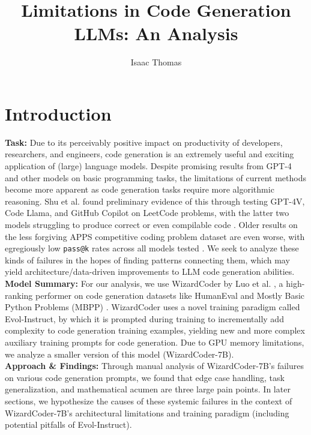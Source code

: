 \documentclass[10pt]{article}
\title{Limitations in Code Generation LLMs: An Analysis}
\author{Isaac Thomas}
\date{}
\newcommand{\code}[1]{\texttt{#1}}
\theoremstyle{definition}
\begin{document}
\maketitle
\section{Introduction}
\noindent\textbf{Task:} Due to its perceivably positive impact on productivity of developers, researchers, and engineers, code generation is an extremely useful and exciting application of (large) language models. Despite promising results from GPT-4 \cite{gpt4} and other models on basic programming tasks, the limitations of current methods become more apparent as code generation tasks require more algorithmic reasoning. Shu et al. found preliminary evidence of this through testing GPT-4V, Code Llama, and GitHub Copilot on LeetCode problems, with the latter two models struggling to produce correct or even compilable code \cite{llmeval1}. Older results on the less forgiving APPS competitive coding problem dataset are even worse, with egregiously low \code{pass@k} rates across all models tested \cite{paperswithcode}. We seek to analyze these kinds of failures in the hopes of finding patterns connecting them, which may yield architecture/data-driven improvements to LLM code generation abilities.\\

\noindent\textbf{Model Summary:} For our analysis, we use WizardCoder by Luo et al. \cite{wizardcoder}, a high-ranking performer on code generation datasets like HumanEval \cite{humaneval} and Mostly Basic Python Problems (MBPP) \cite{mbpp}. WizardCoder uses a novel training paradigm called Evol-Instruct, by which it is prompted during training to incrementally add complexity to code generation training examples, yielding new and more complex auxiliary training prompts for code generation. Due to GPU memory limitations, we analyze a smaller version of this model (WizardCoder-7B).\\

\noindent\textbf{Approach \& Findings:} Through manual analysis of WizardCoder-7B's failures on various code generation prompts, we found that edge case handling, task generalization, and mathematical acumen are three large pain points. In later sections, we hypothesize the causes of these systemic failures in the context of WizardCoder-7B's architectural limitations and training paradigm (including potential pitfalls of Evol-Instruct). 
\end{document}
